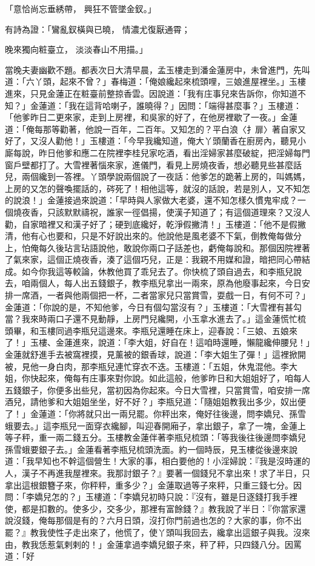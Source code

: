 \begin{showcontents}{}
「意恰尚忘垂綉帶， 興狂不管墜金釵。」

有詩為證：「鸞亂釵橫與已曉， 情濃尤復厭通霄；

晚來獨向粧臺立， 淡淡春山不用描。」

當晚夫妻幽歡不題。都表次日大清早晨，孟玉樓走到潘金蓮房中，未曾進門，先叫道：「六丫頭，起來不曾？」春梅道：「俺娘纔起來梳頭哩，三娘進屋裡坐。」玉樓進來，只見金蓮正在粧臺前整掠香雲。因說道：「我有庄事兒來告訴你，你知道不知？」金蓮道：「我在這背哈喇子，誰曉得？」因問：「端得甚麼事？」玉樓道：「他爹昨日二更來家，走到上房裡，和吳家的好了，在他房裡歇了一夜。」金蓮道：「俺每那等勸著，他說一百年，二百年。又知怎的？平白浪〈扌扉〉著自家又好了，又沒人勸他！」玉樓道：「今早我纔知道，俺大丫頭蘭香在廚房內，聽見小廝每說，昨日他爹和應二在院裡李桂兒家吃酒，看出淫婦家甚麼破綻，把淫婦每門窗戶壁都打了。大雪裡著惱來家，進儀門，看見上房燒夜香，想必聽見些甚麼話兒，兩個纔到一答裡。丫頭學說兩個說了一夜話：他爹怎的跪著上房的，叫媽媽，上房的又怎的聲喚擺話的，硶死了！相他這等，就沒的話說，若是別人，又不知怎的說浪！」金蓮接過來說道：「早時與人家做大老婆，還不知怎樣久慣鬼牢成？一個燒夜香，只該默默禱祝，誰家一徑倡揚，使漢子知道了；有這個道理來？又沒人勸，自家暗裡又和漢子好了；硬到底纔好，乾淨假撇清！」玉樓道：「他不是假撇清，他有心也要和，只是不好說出來的。他說他是風老婆不下氣，倒教俺每做分上，怕俺每久後玷言玷語說他，敢說你兩口子話差也，虧俺每說和。那個因院裡著了氣來家，這個正燒夜香，湊了這個巧兒，正是：我親不用媒和證，暗把同心帶結成。如今你我這等較論，休教他買了乖兒去了。你快梳了頭自過去，和李瓶兒說去，咱兩個人，每人出五錢銀子，教李瓶兒拿出一兩來，原為他廢事起來，今日安排一席酒，一者與他兩個把一杯，二者當家兒只當賞雪，耍戲一日，有何不可？」金蓮道：「你說的是，不知他爹，今日有個勾當沒有？」玉樓道：「大雪裡有甚勾當？我來時兩口子還不見動靜，上房門兒纔開，小玉拿水進去了。」這金蓮慌忙梳頭畢，和玉樓同過李瓶兒這邊來。李瓶兒還睡在床上，迎春說：「三娘、五娘來了！」玉樓、金蓮進來，說道：「李大姐，好自在！這咱時還睡，懶龍纔伸腰兒！」金蓮就舒進手去被窩裡摸，見薰被的銀香球，說道：「李大姐生了彈！」這裡掀開被，見他一身白肉，那李瓶兒連忙穿衣不迭。玉樓道：「五姐，休鬼混他。李大姐，你快起來，俺每有庄事來對你說。如此這般，他爹昨日和大姐姐好了，咱每人五錢銀子，你便多出些兒，當初因為你起來。今日大雪裡，只當賞雪，咱安排一席酒兒，請他爹和大姐姐坐坐，好不好？」李瓶兒道：「隨姐姐教我出多少，奴出便了！」金蓮道：「你將就只出一兩兒罷。你秤出來，俺好往後邊，問李嬌兒、孫雪蛾要去。」這李瓶兒一面穿衣纔腳，叫迎春開廂子，拿出銀子，拿了一塊，金蓮上等子秤，重一兩二錢五分。玉樓教金蓮伴著李瓶兒梳頭：「等我後往後邊問李嬌兒孫雪蛾要銀子去。」金蓮看著李瓶兒梳頭洗面。約一個時辰，見玉樓從後邊來說道：「我早知也不幹這個營生！大家的事，相白要他的！小淫婦說：『我是沒時運的人，漢子不再進我屋裡來。我那討銀子？』要著一個錢兒不拿出來！求了半日，只拿出這根銀簪子來，你秤秤，重多少？」金蓮取過等子來秤，只重三錢七分。因問：「李嬌兒怎的？」玉樓道：「李嬌兒初時只說：『沒有，雖是日逐錢打我手裡使，都是扣數的。使多少，交多少，那裡有富餘錢？』教我說了半日：『你當家還說沒錢，俺每那個是有的？六月日頭，沒打你門前過也怎的？大家的事，你不出罷？』教我使性子走出來了，他慌了，使丫頭叫我回去，纔拿出這銀子與我。沒來由，教我恁惹氣剌剌的！」金蓮拿過李嬌兒銀子來，秤了秤，只四錢八分。因罵道：「好
\end{showcontents}
